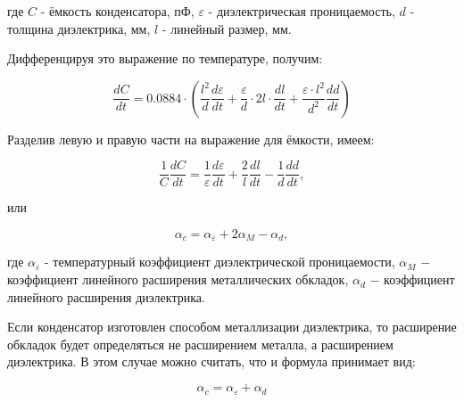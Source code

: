 где $C$ - ёмкость конденсатора, пФ, $\varepsilon$  - диэлектрическая проницаемость, $d$ - толщина диэлектрика, мм, $l$ - линейный размер, мм.

Дифференцируя это выражение по температуре, получим:

\[
\frac{dC}{dt} = 0.0884 \cdot \left( \frac{l^2}{d} \frac{d \varepsilon}{dt} + \frac{\varepsilon}{d} \cdot 2l \cdot \frac{dl}{dt} + \frac{\varepsilon \cdot l^2}{d^2} \frac{dd}{dt} \right)
\]

Разделив левую и правую части на выражение для ёмкости, имеем:

\[
\frac{1}{C} \frac{dC}{dt} = \frac{1}{\varepsilon} \frac{d \varepsilon}{dt} + \frac{2}{l} \frac{dl}{dt} - \frac{1}{d} \frac{dd}{dt},
\]

или

\[
\alpha_c=\alpha_\varepsilon + 2 \alpha_M-\alpha_d,
\]

где $\alpha_\varepsilon$ - температурный коэффициент диэлектрической проницаемости, $\alpha_M$ − коэффициент линейного расширения металлических обкладок, $\alpha_d$ − коэффициент линейного расширения диэлектрика.

Если конденсатор изготовлен способом металлизации диэлектрика, то расширение обкладок будет определяться не расширением металла, а расширением диэлектрика. В этом случае можно считать, что и формула принимает вид:

\[
\alpha_c=\alpha_\varepsilon + \alpha_d
\]